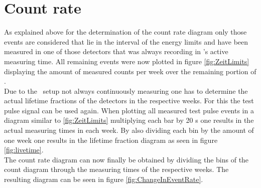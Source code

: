 \documentclass[encoding=utf8,british]{tumphthesis}
\begin{document}
\section{Count rate}

As explained above for the determination of the count rate diagram only those events are considered that lie in the interval of the energy limits and have been measured in one of those detectors that was always recording in \gerda's active measuring time. 
All remaining events were now plotted in figure \ref{fig:ZeitLimits} displaying the amount of measured counts per week over the remaining portion of \PII.
\\

Due to the \gerda\ setup not always continuously measuring one has to determine the actual lifetime fractions of the detectors in the respective weeks.
For this the test pulse signal can be used again.
When plotting all measured test pulse events in a diagram similar to \ref{fig:ZeitLimits} multiplying each bar by 20 s one results in the actual measuring times in each week.
By also dividing each bin by the amount of one week one results in the lifetime fraction diagram as seen in figure \ref{fig:livetime}.
\\

The count rate diagram can now finally be obtained by dividing the bins of the count diagram through the measuring times of the respective weeks.
The resulting diagram can be seen in figure \ref{fig:ChangeInEventRate}.
\end{document}
